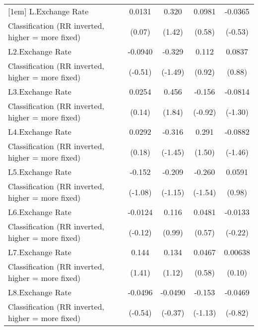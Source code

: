 {\begin{tabular}{l*{4}{c}}
[1em]
L.Exchange Rate     &      0.0131         &       0.320         &      0.0981         &     -0.0365         \\
Classification (RR inverted, higher = more fixed)&      (0.07)         &      (1.42)         &      (0.58)         &     (-0.53)         \\
[1em]
L2.Exchange Rate    &     -0.0940         &      -0.329         &       0.112         &      0.0837         \\
Classification (RR inverted, higher = more fixed)&     (-0.51)         &     (-1.49)         &      (0.92)         &      (0.88)         \\
[1em]
L3.Exchange Rate    &      0.0254         &       0.456         &      -0.156         &     -0.0814         \\
Classification (RR inverted, higher = more fixed)&      (0.14)         &      (1.84)         &     (-0.92)         &     (-1.30)         \\
[1em]
L4.Exchange Rate    &      0.0292         &      -0.316         &       0.291         &     -0.0882         \\
Classification (RR inverted, higher = more fixed)&      (0.18)         &     (-1.45)         &      (1.50)         &     (-1.46)         \\
[1em]
L5.Exchange Rate    &      -0.152         &      -0.209         &      -0.260         &      0.0591         \\
Classification (RR inverted, higher = more fixed)&     (-1.08)         &     (-1.15)         &     (-1.54)         &      (0.98)         \\
[1em]
L6.Exchange Rate    &     -0.0124         &       0.116         &      0.0481         &     -0.0133         \\
Classification (RR inverted, higher = more fixed)&     (-0.12)         &      (0.99)         &      (0.57)         &     (-0.22)         \\
[1em]
L7.Exchange Rate    &       0.144         &       0.134         &      0.0467         &     0.00638         \\
Classification (RR inverted, higher = more fixed)&      (1.41)         &      (1.12)         &      (0.58)         &      (0.10)         \\
[1em]
L8.Exchange Rate    &     -0.0496         &     -0.0490         &      -0.153         &     -0.0469         \\
Classification (RR inverted, higher = more fixed)&     (-0.54)         &     (-0.37)         &     (-1.13)         &     (-0.82)         \\

\end{tabular}}
